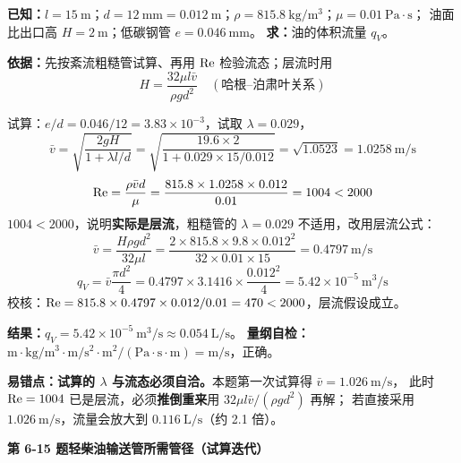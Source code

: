 \begin{jie}
\textbf{已知：}$l=15\ \mathrm{m}$；$d=12\ \mathrm{mm}=0.012\ \mathrm{m}$；$\rho=815.8\ \mathrm{kg/m^3}$；$\mu=0.01\ \mathrm{Pa\cdot s}$；
油面比出口高 $H=2\ \mathrm{m}$；低碳钢管 $e=0.046\ \mathrm{mm}$。
\textbf{求：}油的体积流量 $q_V$。

\textbf{依据：}先按紊流粗糙管试算、再用 $\mathrm{Re}$ 检验流态；层流时用
\[ H=\frac{32\mu l\bar v}{\rho g d^2}\quad(\text{哈根--泊肃叶关系}) \]

试算：$e/d=0.046/12=3.83\times10^{-3}$，试取 $\lambda=0.029$，
\[ \bar v=\sqrt{\frac{2gH}{1+\lambda l/d}}=\sqrt{\frac{19.6\times2}{1+0.029\times15/0.012}}
=\sqrt{1.0523}=1.0258\ \mathrm{m/s} \]
\[ \mathrm{Re}=\frac{\rho\bar vd}{\mu}=\frac{815.8\times1.0258\times0.012}{0.01}=1004<2000 \]
$1004<2000$，说明\textbf{实际是层流}，粗糙管的 $\lambda=0.029$ 不适用，改用层流公式：
\[ \bar v=\frac{H\rho gd^2}{32\mu l}=\frac{2\times815.8\times9.8\times0.012^2}{32\times0.01\times15}=0.4797\ \mathrm{m/s} \]
\[ q_V=\bar v\frac{\pi d^2}{4}=0.4797\times3.1416\times\frac{0.012^2}{4}=5.42\times10^{-5}\ \mathrm{m^3/s} \]
校核：$\mathrm{Re}=815.8\times0.4797\times0.012/0.01=470<2000$，层流假设成立。

\textbf{结果：}$q_V=5.42\times10^{-5}\ \mathrm{m^3/s}\approx0.054\ \mathrm{L/s}$。
\textbf{量纲自检：}$\mathrm{m\cdot kg/m^3\cdot m/s^2\cdot m^2/(Pa\cdot s\cdot m)}=\mathrm{m/s}$，正确。
\end{jie}

\begin{yicuo}
\textbf{易错点：试算的 $\lambda$ 与流态必须自洽。}本题第一次试算得 $\bar v=1.026\ \mathrm{m/s}$，
此时 $\mathrm{Re}=1004$ 已是层流，必须\textbf{推倒重来}用 $32\mu l\bar v/(\rho gd^2)$ 再解；
若直接采用 $1.026\ \mathrm{m/s}$，流量会放大到 $0.116\ \mathrm{L/s}$（约 2.1 倍）。
\end{yicuo}

\noindent\textbf{第 6-15 题\quad 轻柴油输送管所需管径（试算迭代）}

